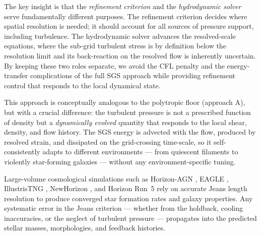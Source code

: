 \documentclass[fleqn,usenatbib]{mnras}
\begin{document}
The key insight is that the \emph{refinement criterion} and the
\emph{hydrodynamic solver} serve fundamentally different purposes.
The refinement criterion decides where spatial resolution is needed;
it should account for all sources of pressure support, including
turbulence.  The hydrodynamic solver advances the resolved-scale
equations, where the sub-grid turbulent stress is by definition
below the resolution limit and its back-reaction on the resolved
flow is inherently uncertain.  By keeping these two roles separate,
we avoid the CFL penalty and the energy-transfer complications of
the full SGS approach while providing refinement control that
responds to the local dynamical state.

This approach is conceptually analogous to the polytropic floor
(approach A), but with a crucial difference: the turbulent pressure
is not a prescribed function of density but a \emph{dynamically
evolved} quantity that responds to the local shear, density, and
flow history.  The SGS energy is advected with the flow, produced
by resolved strain, and dissipated on the grid-crossing time-scale,
so it self-consistently adapts to different environments --- from
quiescent filaments to violently star-forming galaxies --- without
any environment-specific tuning.

Large-volume cosmological simulations such as Horizon-AGN
\citep{Dubois2014}, EAGLE \citep{Schaye2015}, IllustrisTNG
\citep{Pillepich2018}, NewHorizon \citep{Dubois2021}, and Horizon
Run~5 \citep[HR5;][]{Lee2021} rely on accurate Jeans length
resolution to produce converged star formation rates and galaxy
properties.  Any systematic error in the Jeans criterion ---
whether from the holdback, cooling inaccuracies, or the neglect of
turbulent pressure --- propagates into the predicted stellar masses,
morphologies, and feedback histories.
\end{document}
